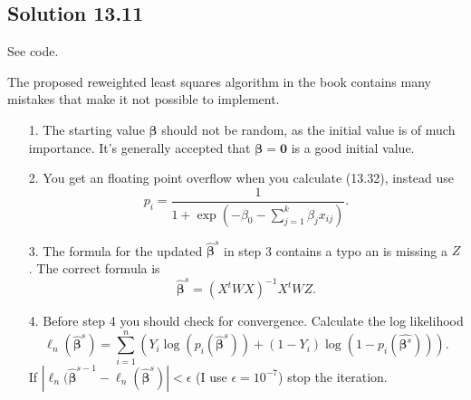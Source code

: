 \subsection*{Solution 13.11}

See code.

The proposed reweighted least squares algorithm in the book contains many mistakes that make it not possible to implement.
\begin{itemize}
    \item[1.] The starting value $\bm{\beta}$ should not be random, as the initial value is of much importance.
        It's generally accepted that $\bm{\beta} = \bm{0}$ is a good initial value.
    \item[2.] You get an floating point overflow when you calculate (13.32), instead use
        \begin{equation*}
            p_i = \frac{1}{1 + \exp(-\beta_0 - \sum_{j = 1}^k \beta_j x_{ij})}.
        \end{equation*}
    \item[3.] The formula for the updated $\hat{\bm{\beta}}^s$ in step 3 contains a typo an is missing a $Z$.
        The correct formula is
        \begin{equation*}
            \hat{\bm{\beta}}^s = (X^t W X)^{-1} X^t W Z.
        \end{equation*}
    \item[4.] Before step 4 you should check for convergence.
        Calculate the log likelihood
        \begin{equation*}
            \ell_n(\hat{\bm{\beta}}^s) = \sum_{i = 1}^n \left(
                Y_i \log(p_i(\hat{\bm{\beta}}^s)) + (1 - Y_i) \log(1 - p_i(\hat{\bm{\beta}^s}))
            \right).
        \end{equation*}
        If $|\ell_n(\hat{\bm{\beta}}^{s - 1} - \ell_n(\hat{\bm{\beta}}^s)| < \epsilon$ (I use $\epsilon = 10^{-7}$) stop the iteration.
\end{itemize}

